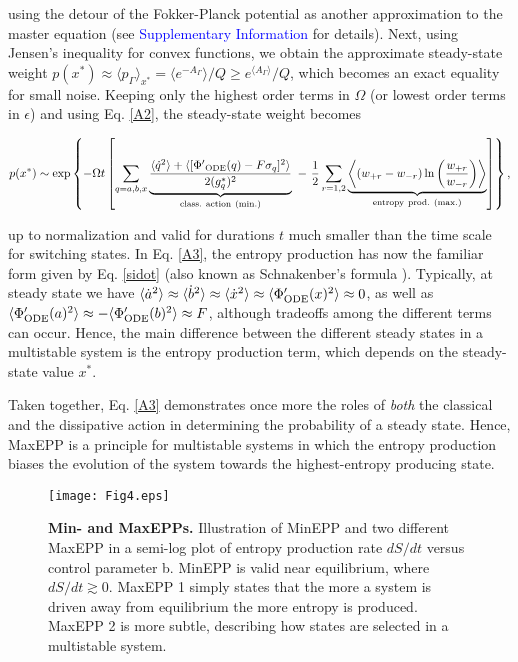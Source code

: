 \documentclass[aps,prl,reprint,singlecolumn,superscriptaddress]{revtex4}
\begin{document}
{\begin{equation}
\end{equation}
using the detour of the Fokker-Planck potential as another approximation to the master equation (see \textcolor{blue}{Supplementary Information} for details).
Next, using Jensen's inequality for convex functions, we obtain the approximate steady-state weight
$p(x^*)\approx \langle p_\Gamma\rangle_{x^*}=\langle e^{-A_\Gamma}\rangle/Q\geq e^{\langle A_\Gamma\rangle}/Q$,
which becomes an exact equality for small noise. Keeping only the highest order terms in $\Omega$ (or lowest order terms in $\epsilon$) 
and using Eq. \ref{A2}, the steady-state weight becomes
\begin{widetext}
\begin{equation}
p(x^*)\sim\exp\left\{-\Omega t\left[\sum_{q=a,b,x}
\underbrace{\frac{\langle\dot q^2\rangle + \langle[{\Phi'}_{\rm ODE}(q)-F\sigma_{q}]^2\rangle}{2(g_q^*)^2}}_{\rm class.\ action\ (min.)}
\ -\ \frac{1}{2}\sum_{r=1,2}\underbrace{\left\langle(w_{+r}-w_{-r})\ln\left(\frac{w_{+r}}{w_{-r}}\right)\right\rangle}_{\rm entropy\ prod.\ (max.)}
\right]\right\},\label{A3}
\end{equation}
\end{widetext}
up to normalization and valid for durations $t$ much smaller than the time scale for switching states. 
In Eq. \ref{A3}, the entropy production has now the familiar form given by Eq. \ref{sidot} (also known as 
Schnakenber's formula \cite{schnakenberg76}). Typically, at steady state we have
$\langle\dot a^2\rangle\approx\langle\dot b^2\rangle\approx\langle\dot x^2\rangle\approx\langle\Phi'_{\rm ODE}(x)^2\rangle\approx 0$, as well as 
$\langle\Phi'_{\rm ODE}(a)^2\rangle\approx-\langle\Phi'_{\rm ODE}(b)^2\rangle\approx F$, although tradeoffs among the different terms can occur.
Hence, the main difference between the different steady states in a multistable system is the entropy production term, which depends on
the steady-state value $x^*$.

{Taken together, Eq. \ref{A3} demonstrates once more the roles of {\it both} the classical and the dissipative action in 
determining the probability of a steady state.  Hence, MaxEPP is a principle for multistable systems 
in which the entropy production biases the evolution of the system towards the highest-entropy producing state.}\\

\begin{figure}[b]
\texttt{[image: Fig4.eps]}
\caption{{\bf Min- and MaxEPPs.}
Illustration of MinEPP and two different MaxEPP in a semi-log plot of entropy production rate $dS/dt$ versus control parameter b. 
MinEPP is valid near equilibrium, where $dS/dt\gtrsim 0$. MaxEPP 1 simply states that the more a system is driven away
from equilibrium the more entropy is produced. MaxEPP 2 is more subtle, describing how states are selected in a multistable
system.} 
\label{fig4}
\end{figure}



}
\end{document}
